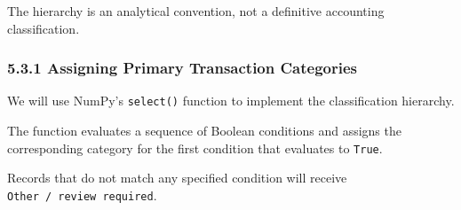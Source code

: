 \documentclass[11pt]{article}
\begin{document}
The hierarchy is an analytical convention, not a definitive accounting
classification.

    \subsubsection{5.3.1 Assigning Primary Transaction
Categories}\label{assigning-primary-transaction-categories}

We will use NumPy's \texttt{select()} function to implement the
classification hierarchy.

The function evaluates a sequence of Boolean conditions and assigns the
corresponding category for the first condition that evaluates to
\texttt{True}.

Records that do not match any specified condition will receive
\texttt{Other\ /\ review\ required}.
\end{document}
